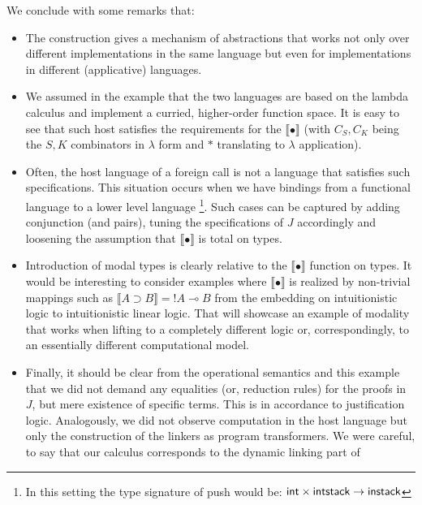        We conclude with some remarks that:
        \begin{itemize}
            \item The construction gives a mechanism of abstractions that works not only over different implementations in the
            same language but even for implementations in different (applicative) languages.
            \item We assumed in the example that the  two languages are based on the lambda calculus and implement a curried, higher-order function space. 
            It is easy to see that such host satisfies the requirements for the $\llbracket\bullet\rrbracket$ 
            (with $C_S, C_K$ being the $S, K$ combinators in $\lambda$ form  and $*$ translating to $\lambda$ application).
            \item
            Often, the host language of a foreign call is  not  a language that satisfies  such specifications. This situation occurs  when we have bindings from a functional language to a lower level language \footnote{In this setting the type signature of {\sf push} would be: $\mathtt{\sf int \times intstack\rightarrow instack}$}. 
            Such cases  can be captured by adding conjunction (and pairs), tuning the  specifications of $J$  accordingly and loosening the assumption that $\llbracket \bullet \rrbracket$
            is total on types.
            \item Introduction of  modal types is clearly relative to the $\llbracket\bullet \rrbracket$ function on types. 
            It would be interesting to consider examples where   $\llbracket\bullet \rrbracket$ is realized by non-trivial mappings such as $\llbracket A\supset B \rrbracket= !A \multimap B$
            from the embedding on intuitionistic logic to intuitionistic linear logic.
            That will  showcase an example of   modality that works when lifting to a completely different logic or, correspondingly, to an essentially
            different computational model.
            \item Finally, it should be clear from the operational semantics and this example that we did not demand any equalities (or, reduction rules)  
            for the proofs in $J$, but mere existence of specific terms. This is in accordance to justification logic.  Analogously, we did not observe computation 
            in the host language but only the construction of the linkers as program transformers. We were careful, to say that our calculus corresponds to the dynamic 
            linking part of 

\end{itemize}
